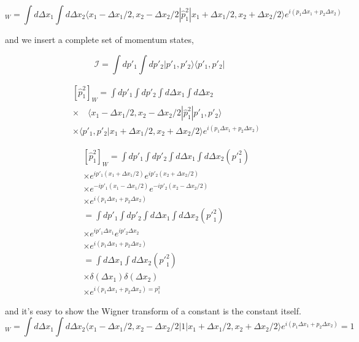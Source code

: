 \documentclass[phd,tocprelim]{cornell}
\begin{document}
\begin{equation}
[\hat{p}_1^2]_W=\int d \Delta x_1 \int d \Delta x_2 \langle {x}_1-\Delta {x}_{1}/{2},{x}_2-\Delta {x}_{2}/{2} | \hat{p}_{1}^2 | {x}_1+\Delta {x}_{1}/{2},{x}_2+\Delta {x}_{2}/{2} \rangle e^{i(p_1\Delta x_1+p_2\Delta x_2)}
\end{equation}

and we insert a complete set of momentum states,

\begin{equation}
\mathcal{I}= \int dp'_1 \int dp'_2 |p'_1, p'_2\rangle \langle p'_1, p'_2 |
\end{equation}


\begin{eqnarray}
&&[\hat{p}_1^2]_W= \int dp'_1 \int dp'_2  \int d \Delta x_1 \int d \Delta x_2 \\ 
\nonumber
&& \times
\quad\langle {x}_1-\Delta {x}_{1}/{2},{x}_2-\Delta {x}_{2}/{2} | \hat{p}_{1}^2  |p'_1, p'_2\rangle \\ 
\nonumber
&& \times
 \langle p'_1, p'_2 | {x}_1+\Delta {x}_{1}/{2},{x}_2+\Delta {x}_{2}/{2} \rangle e^{i(p_1\Delta x_1+p_2\Delta x_2)}
\end{eqnarray}

\begin{eqnarray}
&&[\hat{p}_1^2]_W= \int dp'_1 \int dp'_2  \int d \Delta x_1 \int d \Delta x_2 
({p'}_{1}^2)
\\ 
\nonumber
&& \times
e^{ip'_1({x}_1+\Delta {x}_{1}/{2})}e^{ip'_2({x}_2+\Delta {x}_{2}/{2})}
\\ 
\nonumber
&& \times
e^{-ip'_1({x}_1-\Delta {x}_{1}/{2})}e^{-ip'_2({x}_2-\Delta {x}_{2}/{2})}
\\ 
\nonumber
&& \times
e^{i(p_1\Delta x_1+p_2\Delta x_2)}\\
\nonumber
&& = \int dp'_1 \int dp'_2 \int d \Delta x_1 \int d \Delta x_2 ({p'}_{1}^2)
\\ 
\nonumber
&& \times
e^{ip'_1\Delta {x}_{1}}e^{ip'_2\Delta {x}_{2}}
\\ 
\nonumber
&& \times
e^{i(p_1\Delta x_1+p_2\Delta x_2)}
\\ 
\nonumber
&&=
\int d \Delta x_1 \int d \Delta x_2 ({p'}_{1}^2)
\\ 
\nonumber
&& \times
\delta(\Delta {x}_{1})\delta(\Delta {x}_{2})
\\ 
\nonumber
&& \times
e^{i(p_1\Delta x_1+p_2\Delta x_2)= {p}_{1}^2}
\end{eqnarray}

and it's easy to show the Wigner transform of a constant is the constant itself. 
\begin{equation}
[1]_W=\int d \Delta x_1 \int d \Delta x_2 \langle {x}_1-\Delta {x}_{1}/{2},{x}_2-\Delta {x}_{2}/{2} | 1 | {x}_1+\Delta {x}_{1}/{2},{x}_2+\Delta {x}_{2}/{2} \rangle e^{i(p_1\Delta x_1+p_2\Delta x_2)}=1
\end{equation}
\end{document}
